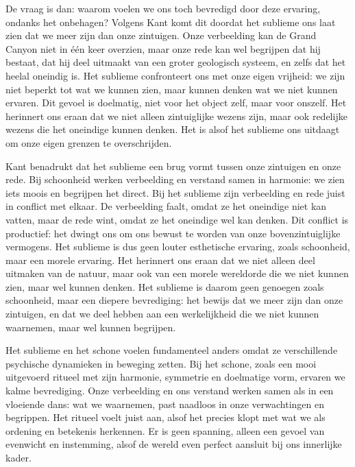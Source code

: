 \begin{mdframed}[leftmargin=0pt,rightmargin=0pt,backgroundcolor=blue!6,linecolor=white,innertopmargin=6pt,innerbottommargin=6pt]
De vraag is dan: waarom voelen we ons toch bevredigd door deze ervaring, ondanks het onbehagen? Volgens Kant komt dit doordat het sublieme ons laat zien dat we meer zijn dan onze zintuigen. Onze verbeelding kan de Grand Canyon niet in één keer overzien, maar onze rede kan wel begrijpen dat hij bestaat, dat hij deel uitmaakt van een groter geologisch systeem, en zelfs dat het heelal oneindig is. Het sublieme confronteert ons met onze eigen vrijheid: we zijn niet beperkt tot wat we kunnen zien, maar kunnen denken wat we niet kunnen ervaren. Dit gevoel is doelmatig, niet voor het object zelf, maar voor onszelf. Het herinnert ons eraan dat we niet alleen zintuiglijke wezens zijn, maar ook redelijke wezens die het oneindige kunnen denken. Het is alsof het sublieme ons uitdaagt om onze eigen grenzen te overschrijden.

Kant benadrukt dat het sublieme een brug vormt tussen onze zintuigen en onze rede. Bij schoonheid werken verbeelding en verstand samen in harmonie: we zien iets moois en begrijpen het direct. Bij het sublieme zijn verbeelding en rede juist in conflict met elkaar. De verbeelding faalt, omdat ze het oneindige niet kan vatten, maar de rede wint, omdat ze het oneindige wel kan denken. Dit conflict is productief: het dwingt ons om ons bewust te worden van onze bovenzintuiglijke vermogens. Het sublieme is dus geen louter esthetische ervaring, zoals schoonheid, maar een morele ervaring. Het herinnert ons eraan dat we niet alleen deel uitmaken van de natuur, maar ook van een morele wereldorde die we niet kunnen zien, maar wel kunnen denken. Het sublieme is daarom geen genoegen zoals schoonheid, maar een diepere bevrediging: het bewijs dat we meer zijn dan onze zintuigen, en dat we deel hebben aan een werkelijkheid die we niet kunnen waarnemen, maar wel kunnen begrijpen.

\bigskip

Het sublieme en het schone voelen fundamenteel anders omdat ze verschillende psychische dynamieken in beweging zetten. Bij het schone, zoals een mooi uitgevoerd ritueel met zijn harmonie, symmetrie en doelmatige vorm, ervaren we kalme bevrediging. Onze verbeelding en ons verstand werken samen als in een vloeiende dans: wat we waarnemen, past naadloos in onze verwachtingen en begrippen. Het ritueel voelt juist aan, alsof het precies klopt met wat we als ordening en betekenis herkennen. Er is geen spanning, alleen een gevoel van evenwicht en instemming, alsof de wereld even perfect aansluit bij ons innerlijke kader.


\end{mdframed}
